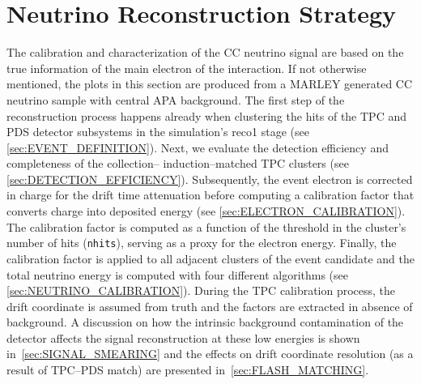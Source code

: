 \section{Neutrino Reconstruction Strategy\label{sec:RECONSTRUCTION}}
The calibration and characterization of the \ac{CC} neutrino signal are based on the true information of the main electron of the interaction. If not otherwise mentioned, the plots in this section are produced from a MARLEY generated \ac{CC} neutrino sample with central \ac{APA} background. The first step of the reconstruction process happens already when clustering the hits of the \ac{TPC} and PDS detector subsystems in the simulation's reco1 stage (see \cref{sec:EVENT_DEFINITION}). Next, we evaluate the detection efficiency and completeness of the collection-- induction--matched \ac{TPC} clusters (see \cref{sec:DETECTION_EFFICIENCY}). Subsequently, the event electron is corrected in charge for the drift time attenuation before computing a calibration factor that converts charge into deposited energy (see \cref{sec:ELECTRON_CALIBRATION}). The calibration factor is computed as a function of the threshold in the cluster's number of hits (\texttt{nhits}), serving as a proxy for the electron energy. Finally, the calibration factor is applied to all adjacent clusters of the event candidate and the total neutrino energy is computed with four different algorithms (see \cref{sec:NEUTRINO_CALIBRATION}). During the \ac{TPC} calibration process, the drift coordinate is assumed from truth and the factors are extracted in absence of background. A discussion on how the intrinsic background contamination of the detector affects the signal reconstruction at these low energies is shown in~\cref{sec:SIGNAL_SMEARING} and the effects on drift coordinate resolution (as a result of \ac{TPC}--PDS match) are presented in~\cref{sec:FLASH_MATCHING}.

